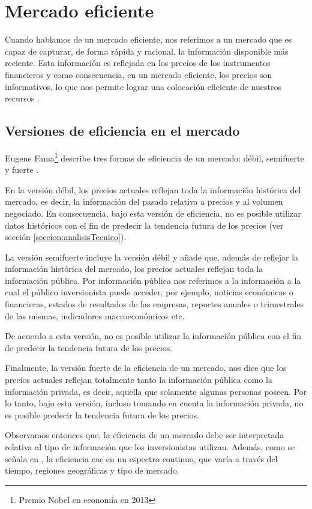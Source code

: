 \documentclass[12pt]{scrbook}
\theoremstyle{break}
\theoremstyle{break}
\begin{document}
\section{Mercado eficiente}
\label{seccion:mercado eficiente}
Cuando hablamos de un mercado eficiente, nos referimos a un mercado que es capaz de capturar, de forma rápida y racional, la información disponible más reciente. Esta información es reflejada en los precios de los instrumentos financieros y como consecuencia, en un mercado eficiente, los precios son informativos, lo que nos permite lograr una colocación eficiente de nuestros recursos \cite{CFA2019}.

\subsection{Versiones de eficiencia en el mercado}
\label{subseccion:versiones emh}
Eugene Fama\footnote{Premio Nobel en economía en 2013} describe tres formas de eficiencia de un mercado: débil, semifuerte y fuerte \cite{Fama1965}.

En la versión débil, los precios actuales reflejan toda la información histórica del mercado, es decir, la información del pasado relativa a precios y al volumen negociado. En consecuencia, bajo esta versión de eficiencia, no es posible utilizar datos históricos con el fin de predecir la tendencia futura de los precios (ver sección \ref{seccion:analisisTecnico}).

La versión semifuerte incluye la versión débil y añade que, además de reflejar la información histórica del mercado, los precios actuales reflejan toda la información pública. Por información pública nos referimos a la información a la cual el público inversionista puede acceder, por ejemplo, noticias económicas o financieras, estados de resultados de las empresas, reportes anuales o trimestrales de las mismas, indicadores macroeconómicos etc.

De acuerdo a esta versión, no es posible utilizar la información pública con el fin de predecir la tendencia futura de los precios.

Finalmente, la versión fuerte de la eficiencia de un mercado, nos dice que los precios actuales reflejan totalmente tanto la información pública como la información privada, es decir, aquella que solamente algunas personas poseen. Por lo tanto, bajo esta versión, incluso tomando en cuenta la información privada, no es posible predecir la tendencia futura de los precios.

Observamos entonces que, la eficiencia de un mercado debe ser interpretada relativa al tipo de información que los inversionistas utilizan. Además, como se señala en \cite{CFA2019}, la eficiencia cae en un espectro continuo, que varía a través del tiempo, regiones geográficas y tipo de mercado.
\end{document}
